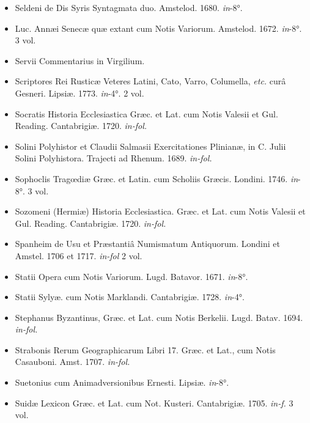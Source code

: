 \documentclass[a4paper, 18pt, oneside]{article}
\begin{document}
\begin{itemize}
    \item Seldeni de Dis Syris Syntagmata duo. Amstelod. 1680. \emph{in}-8°.

    \item Luc. Annæi Senecæ quæ extant cum Notis Variorum. Amstelod. 1672. \emph{in}-8°. 3 vol.

    \item Servii Commentarius in Virgilium.

    \item Scriptores Rei Rusticæ Veteres Latini, Cato, Varro, Columella, \emph{etc.} curâ Gesneri. Lipsiæ. 1773. \emph{in}-4°. 2 vol.

    \item Socratis Historia Ecclesiastica Græc. et Lat. cum Notis Valesii et Gul. Reading. Cantabrigiæ. 1720. \emph{in-fol.}

    \item Solini Polyhistor et Claudii Salmasii Exercitationes Plinianæ, in C. Julii Solini Polyhistora. Trajecti ad Rhenum. 1689. \emph{in-fol.}

    \item Sophoclis Tragœdiæ Græc. et Latin. cum Scholiis Græcis. Londini. 1746. \emph{in}-8°. 3 vol.

    \item Sozomeni (Hermiæ) Historia Ecclesiastica. Græc. et Lat. cum Notis Valesii et Gul. Reading. Cantabrigiæ. 1720. \emph{in-fol.}

    \item Spanheim de Usu et Præstantiâ Numismatum Antiquorum. Londini et Amstel. 1706 et 1717. \emph{in-fol} 2 vol.

    \item Statii Opera cum Notis Variorum. Lugd. Batavor. 1671. \emph{in}-8°.

    \item Statii Sylyæ. cum Notis Marklandi. Cantabrigiæ. 1728. \emph{in}-4°.

    \item Stephanus Byzantinus, Græc. et Lat. cum Notis Berkelii. Lugd. Batav. 1694. \emph{in-fol.}

    \item Strabonis Rerum Geographicarum Libri 17. Græc. et Lat., cum Notis Casauboni. Amst. 1707. \emph{in-fol.}

    \item Suetonius cum Animadversionibus Ernesti. Lipsiæ. \emph{in}-8°.

    \item Suidæ Lexicon Græc. et Lat. cum Not. Kusteri. Cantabrigiæ. 1705. \emph{in-f.} 3 vol.


\end{itemize}
\end{document}
